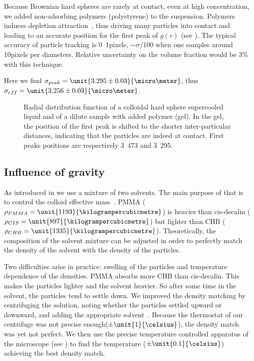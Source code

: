 Because Brownian hard spheres are rarely at contact, even at high concentration, we added non-adsorbing polymers (polystyrene) to the suspension. Polymers induces depletion attraction~\citep{asakura1954}, thus driving many particles into contact and leading to an accurate position for the first peak of $g(r)$ (see ). The typical accuracy of particle tracking is \unit{0.1}{pixels},  $\sim\sigma/100$ when one samples around \unit{10}{pixels} per diameters. Relative uncertainty on the volume fraction would be $3\%$ with this technique.

Here we find $\sigma_{peak}=\unit{3.295\pm0.03}{\micro\meter}$, thus $\sigma_{eff}=\unit{3.256\pm0.03}{\micro\meter}$.

\begin{figure}
	\resizebox{0.9\textwidth}{!}{}
	\caption{Radial distribution function of a colloidal hard sphere supercooled liquid and of a dilute sample with added polymer (gel). In the gel, the position of the first peak is shifted to the shorter inter-particular distances, indicating that the particles are indeed at contact. First peaks positions are respectively \unit{3.473}{\micro\meter} and \unit{3.295}{\micro\meter}.}
	\label{fig:rdf-contact}
\end{figure}



\subsection{Influence of gravity}

As introduced in  we use a mixture of two solvents. The main purpose of that is to control the colloid effective mass~\citep{royall2005}. \ac{PMMA} ($\rho_{PMMA}=\unit{1193}{\kilogrampercubicmetre}$) is heavier than cis-decalin ($\rho_{CIS}=\unit{897}{\kilogrampercubicmetre}$) but lighter than \ac{CHB} ($\rho_{CHB}=\unit{1335}{\kilogrampercubicmetre}$). Theoretically, the composition of the solvent mixture can be adjusted in order to perfectly match the density of the solvent with the density of the particles.

Two difficulties arise in practice: swelling of the particles and temperature dependence of the densities. \ac{PMMA} absorbs more \ac{CHB} than cis-decalin. This makes the particles lighter and the solvent heavier. So after some time in the solvent, the particles tend to settle down. We improved the density matching by centrifuging the solution, noting whether the particles settled upward or downward, and adding the appropriate solvent~\citep{dinsmore2001tdc}. Because the thermostat of our centrifuge was not precise enough($\pm \unit{1}{\celsius}$), the density match was yet not perfect. We then use the precise temperature controlled apparatus of the microscope (see ) to find the temperature ($\pm \unit{0.1}{\celsius}$) achieving the best density match.


